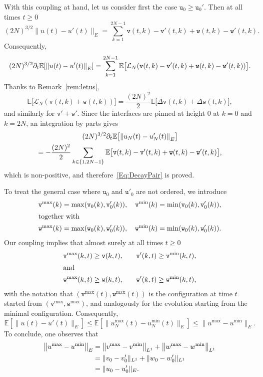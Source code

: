 \documentclass[AHL,Unicode,longabstracts]{cedram}
\theoremstyle{plain}
\newcommand{\ttv}{\mathtt{v}}
\newcommand{\ttw}{\mathtt{w}}
\newcommand{\tu}{\mathtt{u}}
\newcommand{\tv}{\mathtt{v}}
\newcommand{\Tw}{\mathtt{w}}
\newcommand{\cL}{\mathcal{L}}
\newcommand{\E}{\mathbb{E}}
\let\originalleft\left
\let\originalright\right
\renewcommand{\left}{\mathopen{}\mathclose\bgroup\originalleft}
\renewcommand{\right}{\aftergroup\egroup\originalright}
\begin{document}
With this coupling at hand, let us consider first the case $\tu_0 \ge \tu_0'$. Then at all times $t\ge 0$
\[
(2 N)^{3/2}\| u(t) - u'(t)\|_E = \sum_{k=1}^{2N-1} \ttv(t,k)-\ttv'(t,k) + \ttw(t,k)-\ttw'(t,k).
\]
Consequently,
\[
(2 N)^{3/2}\partial_t \E\left[\left\| u(t) - u'(t)\right\|_E\right] = \sum_{k=1}^{2N-1} \E\bigl[\cL_N\left(\ttv(t,k)-\ttv'(t,k) + \ttw(t,k)-\ttw'(t,k)\right) \bigr].
\]
Thanks to Remark~\ref{rem:letus},
\[
\E\big[\cL_N(\ttv(t,k)+ \ttw(t,k)) \big] =\frac{(2N)^2}{2}\E\big[\Delta \ttv(t,k) + \Delta \ttw(t,k) \big],
\]
and similarly for $\ttv' + \ttw'$. Since the interfaces are pinned at height $0$ at $k=0$ and $k=2N$, an integration by parts gives
\begin{multline*}
(2 N)^{3/2} \partial_t \E\bigl[\left\| u_N(t) - u_N'(t)\right\|_E\bigr]\\
= -\frac{(2N)^2}{2} \sum_{k\in \{1,2N-1\}} \E\big[\ttv(t,k)-\ttv'(t,k)+\ttw(t,k)-\ttw'(t,k)\big],
\end{multline*}
which is non-positive, and therefore~\eqref{Eq:DecayPair} is proved.

To treat the general case where $\tu_0$ and $\tu'_0$ are not ordered, we introduce
\begin{alignat*}{3}
\tv^{\max}(k) = \max(\tv_0(k),\tv_0'(k)),\quad \tv^{\min}(k) = \min(\tv_0(k),\tv_0'(k)),\\
\intertext{together with}
\Tw^{\max}(k) = \max(\Tw_0(k),\Tw_0'(k)),\quad \Tw^{\min}(k) = \min(\Tw_0(k),\Tw_0'(k)).
\end{alignat*}
Our coupling implies that almost surely at all times $t\ge 0$
\begin{alignat*}{3}
\ttv^{\max}(k,t) &\ge \ttv(k,t),\quad  &\ttv'(k,t) &\ge \ttv^{\min}(k,t),\\
\intertext{and}
\ttw^{\max}(k,t) &\ge \ttw(k,t),\quad &\ttw'(k,t) &\ge \ttw^{\min}(k,t),
\end{alignat*}
with the notation that $(\ttv^{\max}(t),\ttw^{\max}(t))$ is the configuration at time $t$ started from $(\ttv^{\max},\ttw^{\max})$, and analogously for the evolution starting from the minimal configuration. Consequently,
\[
\E[\|u(t) - u'(t) \|_{E}]\le \E[\|u_N^{\max}(t) - u_N^{\min}(t) \|_{E}] \le \|u^{\max} - u^{\min} \|_{E}.
\]
To conclude, one observes that
\begin{align*}
\left\|u^{\max} - u^{\min} \right\|_{E} &= \left\|v^{\max} - v^{\min} \right\|_{L^1} + \left\|w^{\max} - w^{\min}\right\|_{L^1}\\
&= \|v_0 - v'_0\|_{L^1} + \|w_0 - w'_0\|_{L^1}\\
&= \|u_0 - u_0'\|_E.
\end{align*}
\end{document}
